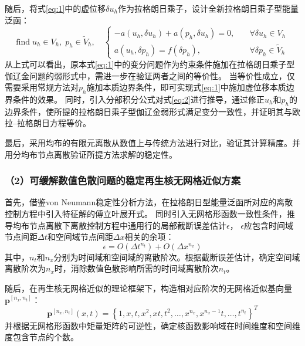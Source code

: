 随后，将式\eqref{eq:1}中的虚位移$\delta u_h$作为拉格朗日乘子，设计全新拉格朗日乘子型能量泛函：
\begin{equation}
    \text{find} \; u_h \in V_h,\; p_h \in \tilde V_h, \quad
    \left \{
    \begin{split} 
        -a(u_h, \delta u_h) + a(p_h, \delta u_h) = 0,\quad &\forall \delta u_h \in V_h \\
        a(u_h, \delta p_h) = f(\delta p_h),\quad &\forall \delta p_h \in \tilde V_h
    \end{split}
    \right .
    \label{eq:2}
\end{equation}
从上式可以看出，原本式\eqref{eq:1}中的变分问题作为约束条件施加在拉格朗日乘子型伽辽金问题的弱形式中，需进一步在验证两者之间的等价性。
当等价性成立，仅需要采用常规方法对$p_h$施加本质边界条件，即可实现式\eqref{eq:1}中施加虚位移本质边界条件的效果。
同时，引入分部积分公式对式\eqref{eq:2}进行推导，通过修正$u_h$和$p_h$的边界条件，使所提的拉格朗日乘子型伽辽金弱形式满足变分一致性，并证明其与欧拉--拉格朗日方程等价。

最后，采用均布的有限元离散从数值上与传统方法进行对比，验证其计算精度。并用分均布节点离散验证所提方法求解的稳定性。

\subsubsection*{\bfseries （2）可缓解数值色散问题的稳定再生核无网格近似方案}
首先，借鉴von Neumann稳定性分析方法，在拉格朗日型能量泛函所对应的离散控制方程中引入特征解的傅立叶展开式。
同时引入无网格形函数一致性条件，推导均布节点离散下离散控制方程中通用行的局部截断误差估计$\epsilon$，
$\epsilon$应包含时间域节点间距$\Delta t$和空间域节点间距$\Delta x$相关的余项：
\begin{equation}
    \epsilon = O(\Delta t^{n_t}) + O(\Delta x^{n_x})
\end{equation}
其中，$n_t$和$n_x$分别为时间域和空间域的离散阶次。根据截断误差估计，确定空间域离散阶次为$n_x$时，消除数值色散影响所需的时间域离散阶次$n_t$。

随后，在再生核无网格近似的理论框架下，构造相对应阶次的无网格近似基向量$\boldsymbol p^{[n_x,n_t]}$：
\begin{equation}
    \boldsymbol p^{[n_x,n_t]}(x,t) = \left \{1, x, t, x^2, xt, t^2, \dots, x^{n_x}, x^{n_x-1}t, \dots, t^{n_t} \right \}^T
\end{equation}
并根据无网格形函数中矩量矩阵的可逆性，确定核函数影响域在时间维度和空间维度包含节点的个数。

    
